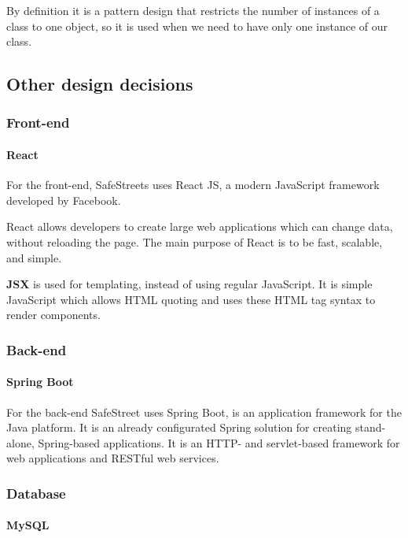 By definition it is a pattern design that restricts the number of instances of a class to one object, so it is used when we need to have only one instance of our class.

\newpage

\subsection{Other design decisions}

\subsubsection{Front-end}

\paragraph{React}

For the front-end, SafeStreets uses React JS, a modern JavaScript framework developed by Facebook.

React allows developers to create large web applications which can change data, without reloading the page. The main purpose of React is to be fast, scalable, and simple.

\textbf{JSX} is used for templating, instead of using regular JavaScript. It is simple JavaScript which allows HTML quoting and uses these HTML tag syntax to render components.

\subsubsection{Back-end}

\paragraph{Spring Boot}

For the back-end SafeStreet uses Spring Boot, is an application framework for the Java platform.
It is an already configurated Spring solution for creating stand-alone, Spring-based applications. It is an HTTP- and servlet-based framework for web applications and RESTful web services.

\subsubsection{Database}

\paragraph{MySQL}

